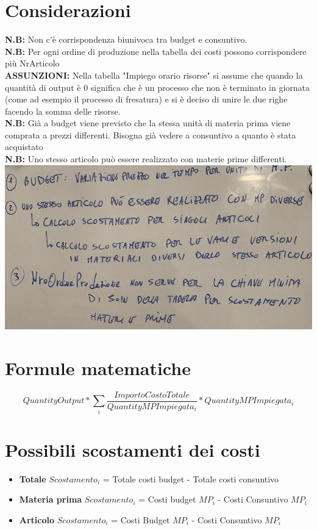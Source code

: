 \documentclass{article}
\begin{document}
\section{Considerazioni}
\textbf{N.B:} Non c’è corrispondenza biunivoca tra budget e consuntivo.
\\\textbf{N.B:} Per ogni ordine di produzione nella tabella dei costi possono corrispondere più NrArticolo
\\\textbf{ASSUNZIONI:} Nella tabella "Impiego orario risorse" si assume che quando la quantità di output è 0 significa che è un processo che non è terminato in giornata (come ad esempio il 
processo di fresatura) e si è deciso di unire le due righe facendo la somma delle risorse.
\\\textbf{N.B:} Già a budget viene previsto che la stessa unità di materia prima viene comprata a prezzi differenti. Bisogna già vedere a consuntivo a quanto è stata acquistato
\\\textbf{N.B:} Uno stesso articolo può essere realizzato con materie prime differenti.
\\\includegraphics[scale = 0.4]{Lavagnetta.jpg}
\section{Formule matematiche}

$$QuantityOutput*\sum_{i}\frac{ImportoCostoTotale}{QuantityMPImpiegata_{i}}*QuantityMPImpiegata_{i}$$
\section{Possibili scostamenti dei costi}
\begin{itemize} 
    \item \textbf{Totale} \rightarrow  $Scostamento_{i}$ = Totale costi budget - Totale costi consuntivo
    \item \textbf{Materia prima} \rightarrow  $Scostamento_{i}$ = Costi budget $MP_{i}$ - Costi Consuntivo $MP_{i}$
    \item \textbf{Articolo} \rightarrow  $Scostamento_{i}$ = Costi Budget $MP_{i}$ - Costi Consuntivo $MP_{i}$
\end{itemize}
\end{document}
